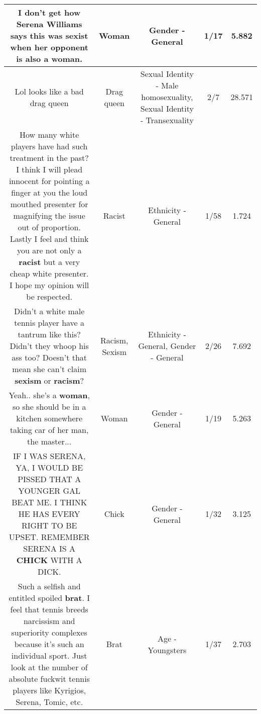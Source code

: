 \documentclass[11pt]{article}
\newlength\mylength
\begin{document}
\begin{center}
\begin{longtable}{|C{.65\mylength}|C{.30\mylength}|C{.12\mylength}|C{.12\mylength}|C{.12\mylength}|}
  \small I don't get how Serena Williams says this was sexist when her opponent is also a \textbf{woman}.\normalsize   & Woman & Gender - General & 1/17 & 5.882 \\  \hline
  \small Lol looks like a bad drag queen\normalsize   & Drag queen & Sexual Identity - Male homosexuality, Sexual Identity - Transexuality & 2/7 & 28.571 \\  \hline
  \small How many white players have had such treatment in the past? I think I will plead innocent for pointing a finger at you the loud mouthed presenter for magnifying the issue out of proportion. Lastly I feel and think you are not only a \textbf{racist} but a very cheap white presenter. I hope my opinion will be respected.\normalsize   & Racist & Ethnicity - General & 1/58 & 1.724 \\  \hline
  \small Didn't a white male tennis player have a tantrum like this? Didn't they whoop his ass too? Doesn't that mean she can't claim \textbf{sexism} or \textbf{racism}?\normalsize   & Racism, Sexism & Ethnicity - General, Gender - General & 2/26 & 7.692 \\  \hline
  \small Yeah.. she's a \textbf{woman}, so she should be in a kitchen somewhere taking car of her man, the master...\normalsize   & Woman & Gender - General & 1/19 & 5.263 \\  \hline
  \small IF I WAS SERENA, YA, I WOULD BE PISSED THAT A YOUNGER GAL BEAT ME.  I THINK HE HAS EVERY RIGHT TO BE UPSET.  REMEMBER SERENA IS A \textbf{CHICK} WITH A DICK.\normalsize   & Chick & Gender - General & 1/32 & 3.125 \\  \hline
  \small Such a selfish and entitled spoiled \textbf{brat}. I feel that tennis breeds narcissism and superiority complexes because it's such an individual sport. Just look at the number of absolute fuckwit tennis players like Kyrigios, Serena, Tomic, etc.\normalsize   & Brat & Age - Youngsters & 1/37 & 2.703 \\  \hline

\end{longtable}
\end{center}
\end{document}
